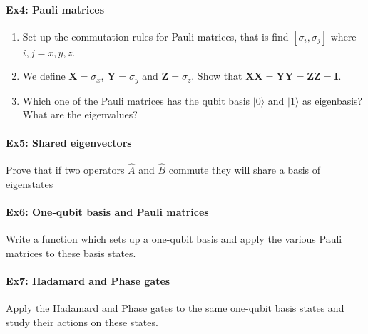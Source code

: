 \paragraph{Ex4: Pauli matrices}
\begin{enumerate}
\item Set up the commutation rules for Pauli matrices, that is find $[\sigma_i,\sigma_j]$ where $i,j=x,y,z$.

\item We define $\bm{X}=\sigma_x$, $\bm{Y}=\sigma_y$ and $\bm{Z}=\sigma_z$. Show that $\bm{XX}=\bm{YY}=\bm{ZZ}=\bm{I}$.

\item Which one of the Pauli matrices has the qubit basis $\vert 0\rangle$ and $\vert 1\rangle$ as eigenbasis? What are the eigenvalues?
\end{enumerate}



\paragraph{Ex5: Shared eigenvectors}

Prove that if two operators $\hat{A}$ and $\hat{B}$ commute they will share a basis of eigenstates


\paragraph{Ex6: One-qubit basis and  Pauli matrices}

Write a function which sets up a one-qubit basis and apply the various Pauli matrices to these basis states.


\paragraph{Ex7: Hadamard and Phase gates}

Apply the Hadamard and Phase gates to the same one-qubit basis states and study their actions on these states.

